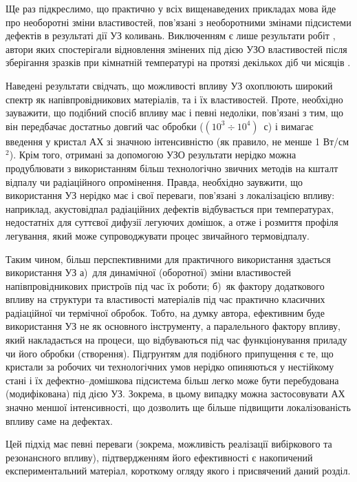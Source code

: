 Ще раз підкреслимо, що практично у всіх вищенаведених прикладах мова йде про необоротні зміни властивостей,
пов'язані з необоротними змінами підсистеми дефектів в результаті дії УЗ коливань.
Виключенням є лише результати робіт \cite{Teterkin2009r,YOlikh2006TPLr}, автори яких спостерігали відновлення змінених під дією УЗО властивостей після зберігання зразків при кімнатній температурі на протязі декількох діб \cite{YOlikh2006TPLr} чи місяців \cite{Teterkin2009r}.

Наведені результати свідчать, що можливості впливу УЗ охоплюють широкий спектр як напівпровідникових матеріалів, та і їх властивостей.
Проте, необхідно зауважити, що подібний спосіб впливу має і певні недоліки, пов'язані з тим, що він передбачає достатньо довгий час обробки ($(10^3\div10^4)$~с) і вимагає введення у кристал АХ зі значною інтенсивністю (як правило, не менше 1 Вт/см$^2$).
Крім того, отримані за допомогою УЗО результати нерідко можна продублювати з використанням більш технологічно звичних методів на кшталт відпалу чи радіаційного опромінення.
Правда, необхідно заувжити, що використання УЗ нерідко має і свої переваги, пов'язані з локалізацією впливу:
наприклад, акустовідпал радіаційних дефектів \cite{PodolHivr,UST:OstrovCsI,YOlikh2007TPLr} відбувається при температурах, недостатніх для суттєвої дифузії легуючих домішок, а отже і розмиття профіля легування, який може супроводжувати процес звичайного термовідпалу.



Таким чином, більш перспективними для практичного використання здається використання УЗ
а)~для динамічної (оборотної) зміни властивостей напівпровідникових пристроїв під час їх роботи;
б)~як фактору додаткового впливу на структури та властивості матеріалів під час практично класичних радіаційної чи термічної обробок.
Тобто, на думку автора, ефективним буде використання УЗ не як основного інструменту, а паралельного фактору впливу, який накладається на процеси, що відбуваються під час функціонування приладу чи його обробки (створення).
Підгрунтям для подібного припущення є те, що кристали за  робочих чи технологічних умов нерідко опиняються у нестійкому стані і їх дефектно--домішкова підсистема більш легко може бути перебудована (модифікована) під дією УЗ.
Зокрема, в цьому випадку можна застосовувати АХ значно меншої інтенсивності,
що дозволить ще більше підвищити локалізованість впливу саме на дефектах.

Цей підхід має певні переваги (зокрема, можливість реалізації вибіркового та резонансного впливу),
підтвердженням його ефективності є накопичений експериментальний матеріал, короткому огляду якого і присвячений даний розділ.


